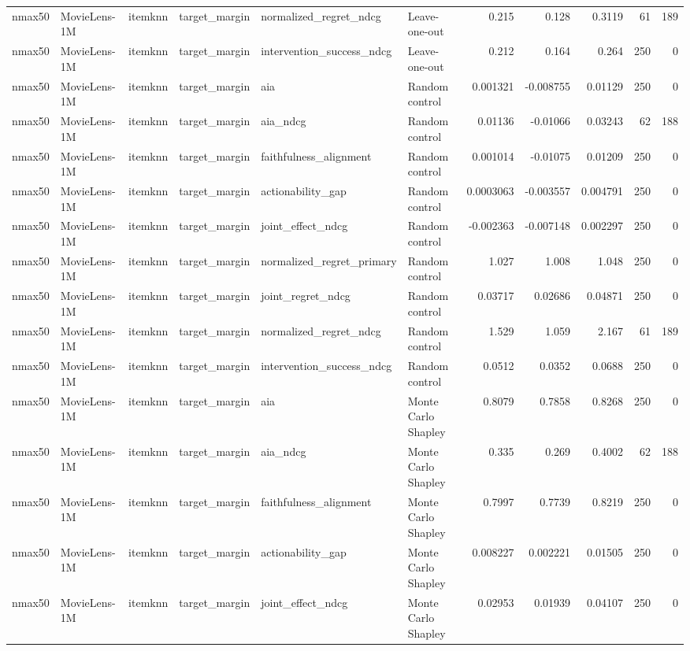 \begin{table}[t]
{\begin{tabular}{llllllrrrrr}
nmax50 & MovieLens-1M & itemknn & target\_margin & normalized\_regret\_ndcg & Leave-one-out & 0.215 & 0.128 & 0.3119 & 61 & 189 \\
nmax50 & MovieLens-1M & itemknn & target\_margin & intervention\_success\_ndcg & Leave-one-out & 0.212 & 0.164 & 0.264 & 250 & 0 \\
nmax50 & MovieLens-1M & itemknn & target\_margin & aia & Random control & 0.001321 & -0.008755 & 0.01129 & 250 & 0 \\
nmax50 & MovieLens-1M & itemknn & target\_margin & aia\_ndcg & Random control & 0.01136 & -0.01066 & 0.03243 & 62 & 188 \\
nmax50 & MovieLens-1M & itemknn & target\_margin & faithfulness\_alignment & Random control & 0.001014 & -0.01075 & 0.01209 & 250 & 0 \\
nmax50 & MovieLens-1M & itemknn & target\_margin & actionability\_gap & Random control & 0.0003063 & -0.003557 & 0.004791 & 250 & 0 \\
nmax50 & MovieLens-1M & itemknn & target\_margin & joint\_effect\_ndcg & Random control & -0.002363 & -0.007148 & 0.002297 & 250 & 0 \\
nmax50 & MovieLens-1M & itemknn & target\_margin & normalized\_regret\_primary & Random control & 1.027 & 1.008 & 1.048 & 250 & 0 \\
nmax50 & MovieLens-1M & itemknn & target\_margin & joint\_regret\_ndcg & Random control & 0.03717 & 0.02686 & 0.04871 & 250 & 0 \\
nmax50 & MovieLens-1M & itemknn & target\_margin & normalized\_regret\_ndcg & Random control & 1.529 & 1.059 & 2.167 & 61 & 189 \\
nmax50 & MovieLens-1M & itemknn & target\_margin & intervention\_success\_ndcg & Random control & 0.0512 & 0.0352 & 0.0688 & 250 & 0 \\
nmax50 & MovieLens-1M & itemknn & target\_margin & aia & Monte Carlo Shapley & 0.8079 & 0.7858 & 0.8268 & 250 & 0 \\
nmax50 & MovieLens-1M & itemknn & target\_margin & aia\_ndcg & Monte Carlo Shapley & 0.335 & 0.269 & 0.4002 & 62 & 188 \\
nmax50 & MovieLens-1M & itemknn & target\_margin & faithfulness\_alignment & Monte Carlo Shapley & 0.7997 & 0.7739 & 0.8219 & 250 & 0 \\
nmax50 & MovieLens-1M & itemknn & target\_margin & actionability\_gap & Monte Carlo Shapley & 0.008227 & 0.002221 & 0.01505 & 250 & 0 \\
nmax50 & MovieLens-1M & itemknn & target\_margin & joint\_effect\_ndcg & Monte Carlo Shapley & 0.02953 & 0.01939 & 0.04107 & 250 & 0 \\

\end{tabular}}
\end{table}
